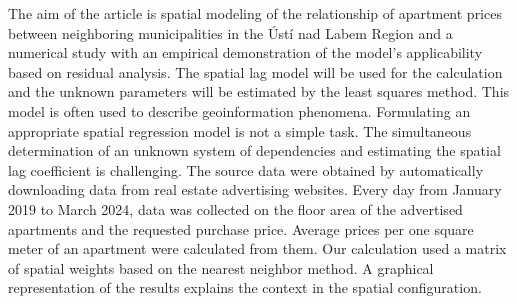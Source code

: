 
\begin{Abstrakt}
    The aim of the article is spatial modeling of the relationship of apartment prices between neighboring municipalities in the Ústí nad Labem Region and a numerical study with an empirical demonstration of the model's applicability based on residual analysis. The spatial lag model will be used for the calculation and the unknown parameters will be estimated by the least squares method. This model is often used to describe geoinformation phenomena. Formulating an appropriate spatial regression model is not a simple task. The simultaneous determination of an unknown system of dependencies and estimating the spatial lag coefficient is challenging. The source data were obtained by automatically downloading data from real estate advertising websites. Every day from January 2019 to March 2024, data was collected on the floor area of the advertised apartments and the requested purchase price. Average prices per one square meter of an apartment were calculated from them. Our calculation used a matrix of spatial weights based on the nearest neighbor method. A graphical representation of the results explains the context in the spatial configuration.
\end{Abstrakt}



\clearpage